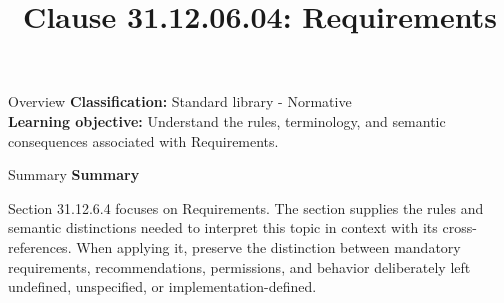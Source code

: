 \documentclass[10pt,letterpaper]{article}
\title{Clause 31.12.06.04: Requirements}
\author{}
\date{}
\begin{document}
\maketitle
\begin{CornellOverviewBox}{Overview}
\textbf{Classification:} Standard library - Normative\\[2pt]
\textbf{Learning objective:} Understand the rules, terminology, and semantic consequences associated with Requirements.
\end{CornellOverviewBox}\begin{CornellSummaryBox}{Summary}
{\sffamily\bfseries\color{Accent} Summary}\par\vspace{3pt}Section 31.12.6.4 focuses on Requirements. The section supplies the rules and semantic distinctions needed to interpret this topic in context with its cross-references. When applying it, preserve the distinction between mandatory requirements, recommendations, permissions, and behavior deliberately left undefined, unspecified, or implementation-defined.
\end{CornellSummaryBox}
\end{document}

